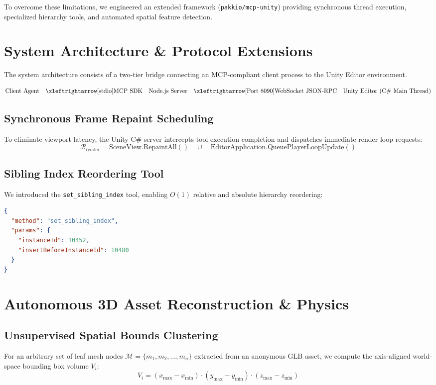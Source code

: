 \documentclass[11pt,a4paper]{article}
\begin{document}
To overcome these limitations, we engineered an extended framework (\texttt{pakkio/mcp-unity}) providing synchronous thread execution, specialized hierarchy tools, and automated spatial feature detection.

\section{System Architecture \& Protocol Extensions}

The system architecture consists of a two-tier bridge connecting an MCP-compliant client process to the Unity Editor environment.

\begin{equation}
\text{Client Agent} \quad \xleftrightarrow[\text{stdio}]{\text{MCP SDK}} \quad \text{Node.js Server} \quad \xleftrightarrow[\text{Port 8090}]{\text{WebSocket JSON-RPC}} \quad \text{Unity Editor (C\# Main Thread)}
\end{equation}

\subsection{Synchronous Frame Repaint Scheduling}
To eliminate viewport latency, the Unity C\# server intercepts tool execution completion and dispatches immediate render loop requests:
\begin{equation}
\mathcal{R}_{\text{render}} = \text{SceneView.RepaintAll}() \quad \cup \quad \text{EditorApplication.QueuePlayerLoopUpdate}()
\end{equation}

\subsection{Sibling Index Reordering Tool}
We introduced the \texttt{set\_sibling\_index} tool, enabling $O(1)$ relative and absolute hierarchy reordering:
\begin{lstlisting}[language=json]
{
  "method": "set_sibling_index",
  "params": {
    "instanceId": 10452,
    "insertBeforeInstanceId": 10480
  }
}
\end{lstlisting}

\section{Autonomous 3D Asset Reconstruction \& Physics}

\subsection{Unsupervised Spatial Bounds Clustering}
For an arbitrary set of leaf mesh nodes $\mathcal{M} = \{m_1, m_2, \dots, m_n\}$ extracted from an anonymous GLB asset, we compute the axis-aligned world-space bounding box volume $V_i$:
\begin{equation}
V_i = (x_{\max} - x_{\min}) \cdot (y_{\max} - y_{\min}) \cdot (z_{\max} - z_{\min})
\end{equation}
\end{document}
